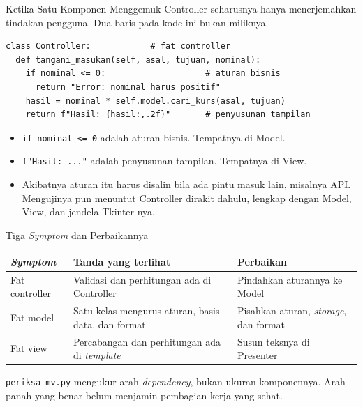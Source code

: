 \documentclass[aspectratio=169, table, 12pt]{beamer}
\begin{document}
\begin{frame}[fragile]{{\Large Ketika Satu Komponen Menggemuk}}
  \vspace{4pt}
  {\small Controller seharusnya hanya menerjemahkan tindakan pengguna. Dua
  baris pada kode ini bukan miliknya.}
  \vspace{4pt}
\begin{lstlisting}[style=PythonStyle]
class Controller:            # fat controller
  def tangani_masukan(self, asal, tujuan, nominal):
    if nominal <= 0:                    # aturan bisnis
      return "Error: nominal harus positif"
    hasil = nominal * self.model.cari_kurs(asal, tujuan)
    return f"Hasil: {hasil:,.2f}"       # penyusunan tampilan
\end{lstlisting}
  \vspace{2pt}
  \begin{itemize}\small
    \item \texttt{if nominal <= 0} adalah aturan bisnis. Tempatnya di Model.
    \item \texttt{f"Hasil: ..."} adalah penyusunan tampilan. Tempatnya di View.
    \item Akibatnya aturan itu harus disalin bila ada pintu masuk lain,
          misalnya API. Mengujinya pun menuntut Controller dirakit dahulu,
          lengkap dengan Model, View, dan jendela Tkinter-nya.
  \end{itemize}
\end{frame}

\begin{frame}{{\Large Tiga \textit{Symptom} dan Perbaikannya}}
  \vspace{6pt}
  \begin{center}\footnotesize
  \begin{tabular}{|l|p{3.9cm}|p{3.7cm}|}
    \hline
    \textbf{\textit{Symptom}} & \textbf{Tanda yang terlihat} & \textbf{Perbaikan} \\
    \hline
    Fat controller & Validasi dan perhitungan ada di Controller & Pindahkan aturannya ke Model \\
    \hline
    Fat model & Satu kelas mengurus aturan, basis data, dan format & Pisahkan aturan, \textit{storage}, dan format \\
    \hline
    Fat view & Percabangan dan perhitungan ada di \textit{template} & Susun teksnya di Presenter \\
    \hline
  \end{tabular}
  \end{center}
  \vspace{4pt}
  {\footnotesize \texttt{periksa\_mv.py} mengukur arah \textit{dependency}, bukan
  ukuran komponennya. Arah panah yang benar belum menjamin pembagian kerja yang
  sehat.}
\end{frame}
\end{document}
